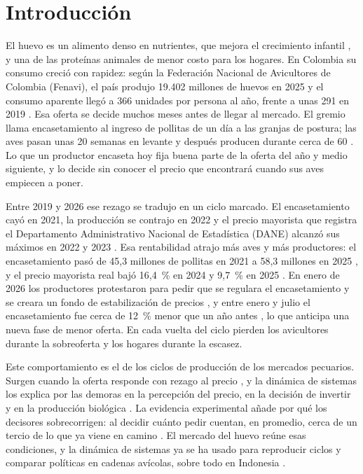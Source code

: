 \documentclass[preprint,12pt,authoryear]{elsarticle}
\begin{document}
\section{Introducción}
\label{sec1}

El huevo es un alimento denso en nutrientes, que mejora el crecimiento infantil \citep{Iannotti2017}, y una de las proteínas animales de menor costo para los hogares. En Colombia su consumo creció con rapidez: según la Federación Nacional de Avicultores de Colombia (Fenavi), el país produjo 19.402 millones de huevos en 2025 y el consumo aparente llegó a 366 unidades por persona al año, frente a unas 291 en 2019 \citep{Fenavi2026Estadisticas,Fenavi2026Fenaviquin440,Quintero2026}. Esa oferta se decide muchos meses antes de llegar al mercado. El gremio llama encasetamiento al ingreso de pollitas de un día a las granjas de postura; las aves pasan unas 20 semanas en levante y después producen durante cerca de 60 \citep{Fenavi2026Fenaviquin440}. Lo que un productor encaseta hoy fija buena parte de la oferta del año y medio siguiente, y lo decide sin conocer el precio que encontrará cuando sus aves empiecen a poner.

Entre 2019 y 2026 ese rezago se tradujo en un ciclo marcado. El encasetamiento cayó en 2021, la producción se contrajo en 2022 y el precio mayorista que registra el Departamento Administrativo Nacional de Estadística (DANE) alcanzó sus máximos en 2022 y 2023 \citep{Fenavi2026Estadisticas,DANE2026SIPSA}. Esa rentabilidad atrajo más aves y más productores: el encasetamiento pasó de 45,3 millones de pollitas en 2021 a 58,3 millones en 2025 \citep{Fenavi2026Estadisticas}, y el precio mayorista real bajó 16,4~\% en 2024 y 9,7~\% en 2025 \citep{DANE2026IPC,DANE2026SIPSA}. En enero de 2026 los productores protestaron para pedir que se regulara el encasetamiento y se creara un fondo de estabilización de precios \citep{Villamizar2026}, y entre enero y julio el encasetamiento fue cerca de 12~\% menor que un año antes \citep{Quintero2026}, lo que anticipa una nueva fase de menor oferta. En cada vuelta del ciclo pierden los avicultores durante la sobreoferta y los hogares durante la escasez.

Este comportamiento es el de los ciclos de producción de los mercados pecuarios. Surgen cuando la oferta responde con rezago al precio \citep{Ezekiel1938}, y la dinámica de sistemas los explica por las demoras en la percepción del precio, en la decisión de invertir y en la producción biológica \citep{Meadows1969}. La evidencia experimental añade por qué los decisores sobrecorrigen: al decidir cuánto pedir cuentan, en promedio, cerca de un tercio de lo que ya viene en camino \citep{Sterman1989b}. El mercado del huevo reúne esas condiciones, y la dinámica de sistemas ya se ha usado para reproducir ciclos y comparar políticas en cadenas avícolas, sobre todo en Indonesia \citep{Yuzaria2025,Haryana2026}.
\end{document}
